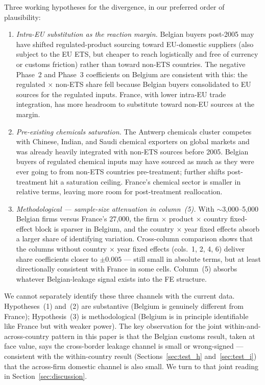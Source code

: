 Three working hypotheses for the divergence, in our preferred order of plausibility:
\begin{enumerate}
    \item \emph{Intra-EU substitution as the reaction margin.} Belgian buyers post-2005 may have shifted regulated-product sourcing toward EU-domestic suppliers (also subject to the EU ETS, but cheaper to reach logistically and free of currency or customs friction) rather than toward non-ETS countries. The negative Phase~2 and Phase~3 coefficients on Belgium are consistent with this: the regulated $\times$ non-ETS share fell because Belgian buyers consolidated to EU sources for the regulated inputs. France, with lower intra-EU trade integration, has more headroom to substitute toward non-EU sources at the margin.

    \item \emph{Pre-existing chemicals saturation.} The Antwerp chemicals cluster competes with Chinese, Indian, and Saudi chemical exporters on global markets and was already heavily integrated with non-ETS sources before 2005. Belgian buyers of regulated chemical inputs may have sourced as much as they were ever going to from non-ETS countries pre-treatment; further shifts post-treatment hit a saturation ceiling. France's chemical sector is smaller in relative terms, leaving more room for post-treatment reallocation.

    \item \emph{Methodological --- sample-size attenuation in column~(5).} With $\sim$3{,}000--5{,}000 Belgian firms versus France's 27{,}000, the firm $\times$ product $\times$ country fixed-effect block is sparser in Belgium, and the country $\times$ year fixed effects absorb a larger share of identifying variation. Cross-column comparison shows that the columns without country $\times$ year fixed effects (cols.\ 1, 2, 4, 6) deliver share coefficients closer to $\pm 0.005$ --- still small in absolute terms, but at least directionally consistent with France in some cells. Column~(5) absorbs whatever Belgian-leakage signal exists into the FE structure.
\end{enumerate}

We cannot separately identify these three channels with the current data. Hypotheses~(1) and~(2) are substantive (Belgium is genuinely different from France); Hypothesis~(3) is methodological (Belgium is in principle identifiable like France but with weaker power). The key observation for the joint within-and-across-country pattern in this paper is that the Belgian customs result, taken at face value, says the cross-border leakage channel is small or wrong-signed --- consistent with the within-country result (Sections~\ref{sec:test_h} and~\ref{sec:test_i}) that the across-firm domestic channel is also small. We turn to that joint reading in Section~\ref{sec:discussion}.

